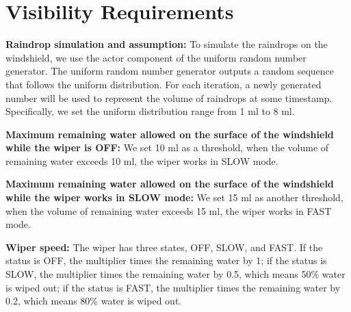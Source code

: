 \section{Visibility Requirements}
\textbf{Raindrop simulation and assumption:}
To simulate the raindrops on the windshield, we use the actor component of the uniform random number generator. The uniform random number generator outputs a random sequence that follows the uniform distribution. For each iteration, a newly generated number will be used to represent the volume of raindrops at some timestamp. Specifically, we set the uniform distribution range from 1 ml to 8 ml.

\textbf{Maximum remaining water allowed on the surface of the windshield while the wiper is OFF:} We set 10 ml as a threshold, when the volume of remaining water exceeds 10 ml, the wiper works in SLOW mode.

\textbf{Maximum remaining water allowed on the surface of the windshield while the wiper works in SLOW mode:} We set 15 ml as another threshold, when the volume of remaining water exceeds 15 ml, the wiper works in FAST mode.

\textbf{Wiper speed:} The wiper has three states, OFF, SLOW, and FAST. If the status is OFF, the multiplier times the remaining water by 1; if the status is SLOW, the multiplier times the remaining water by 0.5, which means 50\% water is wiped out; if the status is FAST, the multiplier times the remaining water by 0.2, which means 80\% water is wiped out. 